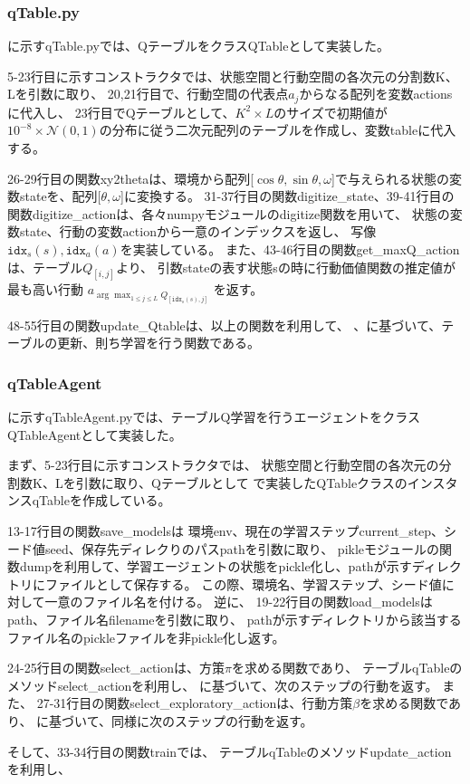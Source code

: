 \documentclass[a4paper,11pt]{jsarticle}
\begin{document}
\subsubsection{qTable.py} \label{sec:qTable}
に示すqTable.pyでは、QテーブルをクラスQTableとして実装した。
\par
5-23行目に示すコンストラクタでは、状態空間と行動空間の各次元の分割数K、Lを引数に取り、
20,21行目で、行動空間の代表点$a_j$からなる配列を変数actionsに代入し、
23行目でQテーブルとして、$K^2\times L$のサイズで初期値が$10^{-8}\times\mathcal{N}(0,1)$の分布に従う二次元配列のテーブルを作成し、変数tableに代入する。\par
26-29行目の関数xy2thetaは、環境から配列[$\cos \theta, \sin \theta, \omega$]で与えられる状態の変数stateを、配列[$\theta, \omega$]に変換する。
31-37行目の関数digitize\_state、39-41行目の関数digitize\_actionは、各々numpyモジュールのdigitize関数を用いて、
状態の変数state、行動の変数actionから一意のインデックスを返し、
写像$\mathtt{idx}_s(s),\mathtt{idx}_a(a)$を実装している。
また、43-46行目の関数get\_maxQ\_actionは、テーブル$Q_{[i,j]}$より、
引数stateの表す状態sの時に行動価値関数の推定値が最も高い行動
$a_{\arg\max_{1\leq j\leq L} Q_{[\mathtt{idx}_s(s), j]}}$
を返す。
\par
48-55行目の関数update\_Qtableは、以上の関数を利用して、
、に基づいて、テーブルの更新、則ち学習を行う関数である。




\subsubsection{qTableAgent} \label{seq:qTableAgent}
に示すqTableAgent.pyでは、テーブルQ学習を行うエージェントをクラスQTableAgentとして実装した。
\par
まず、5-23行目に示すコンストラクタでは、
状態空間と行動空間の各次元の分割数K、Lを引数に取り、Qテーブルとして
で実装したQTableクラスのインスタンスqTableを作成している。
\par
13-17行目の関数save\_modelsは
環境env、現在の学習ステップcurrent\_step、シード値seed、保存先ディレクりのパスpathを引数に取り、
pikleモジュールの関数dumpを利用して、学習エージェントの状態をpickle化し、pathが示すディレクトリにファイルとして保存する。
この際、環境名、学習ステップ、シード値に対して一意のファイル名を付ける。
逆に、
19-22行目の関数load\_modelsはpath、ファイル名filenameを引数に取り、
pathが示すディレクトリから該当するファイル名のpickleファイルを非pickle化し返す。
\par
24-25行目の関数select\_actionは、方策$\pi$を求める関数であり、
テーブルqTableのメソッドselect\_actionを利用し、
に基づいて、次のステップの行動を返す。
また、
27-31行目の関数select\_exploratory\_actionは、行動方策$\beta$を求める関数であり、
に基づいて、同様に次のステップの行動を返す。
\par
そして、33-34行目の関数trainでは、
テーブルqTableのメソッドupdate\_actionを利用し、
\end{document}
